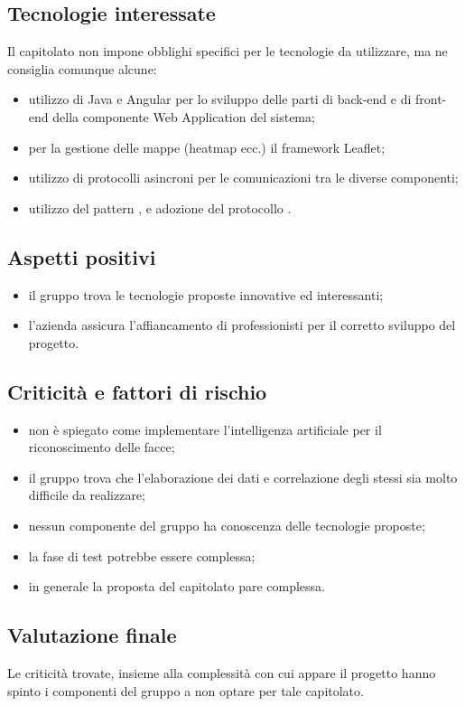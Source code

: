 \subsection{Tecnologie interessate}
Il capitolato non impone obblighi specifici per le tecnologie da utilizzare, ma ne consiglia comunque alcune:
\begin{itemize}
\item utilizzo di Java e Angular per lo sviluppo delle parti di back-end e di front-end della componente Web
Application del sistema;
\item per la gestione delle mappe (heatmap ecc.) il framework Leaflet;
\item utilizzo di protocolli asincroni per le comunicazioni tra le diverse componenti;
\item utilizzo del pattern , e adozione del protocollo .
\end{itemize}

\subsection{Aspetti positivi}
\begin{itemize}
\item il gruppo trova le tecnologie proposte innovative ed interessanti;
\item l'azienda assicura l'affiancamento di professionisti per il corretto sviluppo del progetto.
\end{itemize}

\subsection{Criticità e fattori di rischio}
\begin{itemize}
\item non è spiegato come implementare l'intelligenza artificiale per il riconoscimento delle facce;
\item il gruppo trova che l'elaborazione dei dati e correlazione degli stessi sia molto difficile da realizzare;
\item nessun componente del gruppo ha conoscenza delle tecnologie proposte;
\item la fase di test potrebbe essere complessa;
\item in generale la proposta del capitolato pare complessa.
\end{itemize}

\subsection{Valutazione finale}
Le criticità trovate, insieme alla complessità con cui appare il progetto hanno spinto i componenti del gruppo a non optare per tale capitolato.
